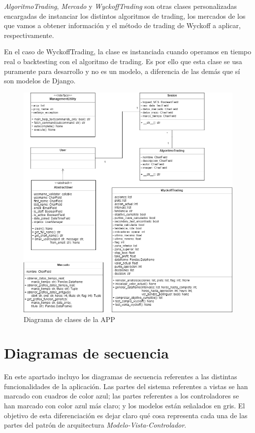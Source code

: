 \textit{AlgoritmoTrading}, \textit{Mercado} y \textit{WyckoffTrading} son otras clases personalizadas encargadas de instanciar los distintos algoritmos de trading, los mercados de los que vamos a obtener información y el método de trading de Wyckoff a aplicar, respectivamente. \newline

En el caso de WyckoffTrading, la clase es instanciada cuando operamos en tiempo real o backtesting con el algoritmo de trading. Es por ello que esta clase se usa puramente para desarrollo y no es un modelo, a diferencia de las demás que sí son modelos de Django.\newline

\begin{figure}[h]
	\includegraphics[width=1.2\textwidth]{imagenes/diagrama_clases.png}
	\caption{Diagrama de clases de la APP} \label{diagrama_clases}
\end{figure}

\section{Diagramas de secuencia}

En este apartado incluyo los diagramas de secuencia referentes a las distintas funcionalidades de la aplicación. Las partes del sistema referentes a vistas se han marcado con cuadros de color azul; las partes referentes a los controladores se han marcado con color azul más claro; y los modelos están señalados en gris. El objetivo de esta diferenciación es dejar claro qué cosa representa cada una de las partes del patrón de arquitectura \textit{Modelo-Vista-Controlador}. \newline

